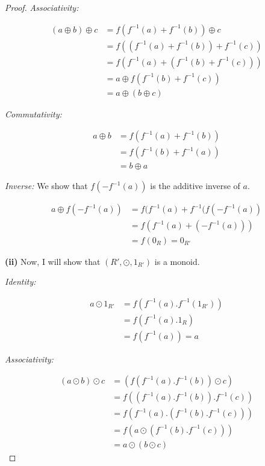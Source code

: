 \documentclass[12pt,a4paper]{article}
\theoremstyle{definition}
\begin{document}
\begin{flushleft}
\begin{proof}
	\medskip

	{\it Associativity:}

	\begin{align*}
		(a \oplus b) \oplus c &= f(f^{-1}(a) + f^{-1}(b)) \oplus c \\
		&= f((f^{-1}(a) + f^{-1}(b)) + f^{-1}(c)) \\
		&= f(f^{-1}(a) + (f^{-1}(b) + f^{-1}(c))) \\
		&= a \oplus f(f^{-1}(b) + f^{-1}(c)) \\
		&= a \oplus (b \oplus c)
	\end{align*}

	\medskip

	{\it Commutativity:}

	\begin{align*}
		a \oplus b &= f(f^{-1}(a) + f^{-1}(b)) \\
		&= f(f^{-1}(b) + f^{-1}(a)) \\
		&= b \oplus a
	\end{align*}

	{\it Inverse:} We show that $f(-f^{-1}(a))$ is the additive inverse of $a$.

	\begin{align*}
		a \oplus f(-f^{-1}(a)) &= f(f^{-1}(a) + f^{-1}(f(-f^{-1}(a)) \\
		&= f(f^{-1}(a) + (-f^{-1}(a))) \\
		&= f(0_R) = 0_{R'}
	\end{align*}


	{\bf (ii)} Now, I will show that $(R',\odot,1_{R'})$ is a monoid.

	\medskip

	{\it Identity:}

	\begin{align*}
		a \odot 1_{R'} &= f(f^{-1}(a).f^{-1}(1_{R'})) \\
		&= f(f^{-1}(a).1_R)\\
		&= f(f^{-1}(a)) = a
	\end{align*}

	{\it Associativity:}

	\begin{align*}			
		(a\odot b)\odot c &= (f(f^{-1}(a).f^{-1}(b))\odot c) \\
		&= f((f^{-1}(a).f^{-1}(b)).f^{-1}(c)) \\
		&= f(f^{-1}(a).(f^{-1}(b).f^{-1}(c))) \\
		&= f(a\odot (f^{-1}(b).f^{-1}(c))) \\
		&= a \odot (b \odot c)
	\end{align*}


\end{proof}
\end{flushleft}
\end{document}
